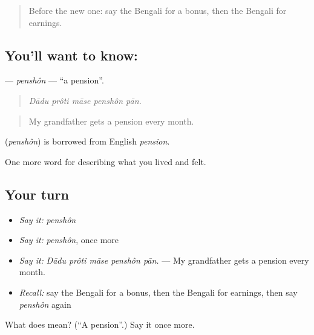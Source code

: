 \begin{quote}
Before the new one: say the Bengali for a bonus, then the Bengali for earnings.
\end{quote}

\subsection*{You'll want to know: }
\textbf{} — \emph{penshôn} — \textquotedblleft{}a pension\textquotedblright{}.

\begin{quote}
    
\end{quote}

\begin{quote}
\emph{Dādu prôti māse penshôn pān.}
\end{quote}

\begin{quote}
My grandfather gets a pension every month.
\end{quote}

\begin{cousinweb}
\textbf{} (\emph{penshôn}) is borrowed from English \emph{pension}.
\end{cousinweb}

\begin{grammarlens}[title={What you've built}]
One more word for describing what you lived and felt.
\end{grammarlens}

\subsection*{Your turn}
\begin{itemize}
\raggedright
  \item \emph{Say it:} \emph{penshôn}
  \item \emph{Say it:} \emph{penshôn}, once more
  \item \emph{Say it:} \emph{Dādu prôti māse penshôn pān.} — My grandfather gets a pension every month.
  \item \emph{Recall:} say the Bengali for a bonus, then the Bengali for earnings, then say \emph{penshôn} again
\end{itemize}

\begin{tcolorbox}[breakable,colback=teal!4,colframe=teal!35!black,title={Before you move on}]
What does  mean? (\textquotedblleft{}A pension\textquotedblright{}.) Say it once more.
\end{tcolorbox}

